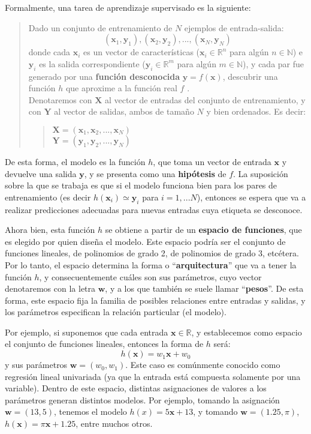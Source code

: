 \documentclass[../../main.tex]{subfiles}
\begin{document}
Formalmente, una tarea de aprendizaje supervisado es la siguiente:
\begin{quote}
    Dado un conjunto de entrenamiento de \(N\) ejemplos de entrada-salida:
    \[(\bm{x}_1, \bm{y}_1), (\bm{x}_2, \bm{y}_2), ..., (\bm{x}_N,
    \bm{y}_N)\] donde cada \(\bm{x}_i\) es un vector de características
    (\(\bm{x}_i \in \mathbb{R}^n\) para algún \(n \in \mathbb{N}\)) e \(\bm{y}_i\)
    es la salida correspondiente (\(\bm{y}_i \in \mathbb{R}^m\) para algún \(m \in
    \mathbb{N}\)), y cada par fue generado por una \textbf{función desconocida}
    \(\bm{\bm{y}}=f(\bm{x})\), descubrir una función \(h\) que aproxime a la
    función real \(f\) \cite{ai-a-modern-approach}.\\
    Denotaremos con \(\bm{X}\) al vector de entradas del conjunto de entrenamiento, y
    con \(\bm{Y}\) al vector de salidas, ambos de tamaño \(N\) y bien ordenados. Es
    decir:
    \begin{quote}
        \(\bm{X}=(\bm{x}_1, \bm{x}_2, ..., \bm{x}_N)\)\\
        \(\bm{Y}=(\bm{y}_1, \bm{y}_2, ..., \bm{y}_N)\)
    \end{quote}
\end{quote}
De esta forma, el modelo es la función \(h\), que toma un vector de entrada \(\bm{x}\) y
devuelve una salida \(\bm{y}\), y se presenta como una \textbf{hipótesis} de \(f\). La
suposición sobre la que se trabaja es que si el modelo funciona bien para los pares de
entrenamiento (es decir \(h(\bm{x}_i) \simeq \bm{y}_i\) para \(i=1,...N\)), entonces se
espera que va a realizar predicciones adecuadas para nuevas entradas cuya etiqueta se
desconoce.

Ahora bien, esta función \(h\) se obtiene a partir de un \textbf{espacio de funciones},
que es elegido por quien diseña el modelo. Este espacio podría ser el conjunto de
funciones lineales, de polinomios de grado 2, de polinomios de grado 3, etcétera. Por lo
tanto, el espacio determina la forma o ``\textbf{arquitectura}'' que va a tener la función
\(h\), y consecuentemente cuáles son sus parámetros, cuyo vector denotaremos con la letra
\(\bm{\bm{w}}\), y a los que también se suele llamar ``\textbf{pesos}''. De esta forma,
este espacio fija la familia de posibles relaciones entre entradas y salidas, y los
parámetros especifican la relación particular (el modelo).

Por ejemplo, si suponemos que cada entrada \(\bm{x} \in \mathbb{R}\), y establecemos
como espacio el conjunto de funciones lineales, entonces la forma de \(h\) será:
\[h(\bm{x}) = w_1 \bm{x} + w_0\] y sus parámetros \(\bm{w}=(w_0, w_1)\). Este caso es
comúnmente conocido como regresión lineal univariada (ya que la entrada está compuesta
solamente por una variable). Dentro de este espacio, distintas asignaciones de valores a
los parámetros generan distintos modelos. Por ejemplo, tomando la asignación \(\bm{w}=(13,
5)\), tenemos el modelo \(h(x) = 5\bm{x} + 13\), y tomando \(\bm{w}=(1{.}25, \pi)\),
\(h(\bm{x}) = \pi \bm{x} + 1{.}25\), entre muchos otros.
\end{document}
